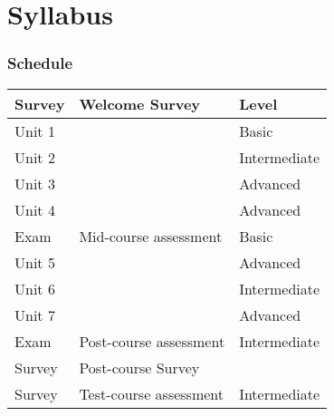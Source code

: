\part{Syllabus}

\section{Schedule}
\begin{center}
  \begin{tabular}{|l|l|l|}
    \hline
    Survey 
    &          Welcome Survey
    &          Level \\
    \hline
    Unit 1 & \nameref{sec:icloud-fundamentals} & Basic \\
    \hline 
    Unit 2 & \nameref{sec:icloud-iaas} & Intermediate \\
    \hline
    Unit 3 & \nameref{sec:icloud-mapreduce} & Advanced \\
    \hline
    Unit 4 & \nameref{sec:icloud-iterative-mapreduce} & Advanced \\
    \hline
    Exam & Mid-course assessment & Basic \\
    \hline
    Unit 5 & \nameref{sec:icloud-nosql} & Advanced \\
    \hline
    Unit 6 & \nameref{sec:icloud-iot}  & Intermediate \\
    \hline
    Unit 7 & \nameref{sec:icloud-saas} & Advanced \\
    \hline
    Exam & Post-course assessment & Intermediate \\
    \hline
    Survey & Post-course Survey  & ~ \\
    \hline
    Survey & Test-course assessment & Intermediate\\
    \hline
  \end{tabular}
\end{center}
